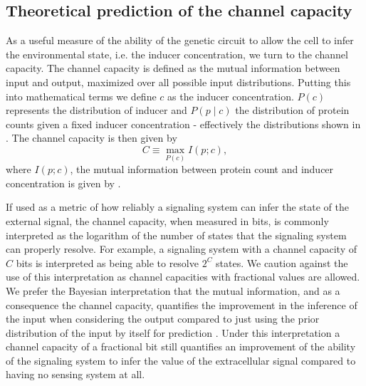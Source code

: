 \subsection{Theoretical prediction of the channel capacity}
\label{sec_channcap}

As a useful measure of the ability of the genetic circuit to allow the cell to
infer the environmental state, i.e. the inducer concentration, we turn to the
channel capacity. The channel capacity is defined as the mutual information
between input and output, maximized over all possible input distributions.
Putting this into mathematical terms we define $c$ as the inducer concentration.
$P(c)$ represents the distribution of inducer and $P(p \mid c)$ the distribution
of protein counts given a fixed inducer concentration - effectively the
distributions shown in . The channel capacity is then given by
\begin{equation}
  C \equiv \max_{P(c)} I(p; c),
  \label{eq_chann_cap}
\end{equation}
where $I(p; c)$, the mutual information between protein count and inducer
concentration is given by .

If used as a metric of how reliably a signaling system can infer the state
of the external signal, the channel capacity, when measured in bits, is commonly
interpreted as the logarithm of the number of states that the signaling system
can properly resolve. For example, a signaling system with a channel capacity
of $C$ bits is interpreted as being able to resolve $2^C$ states. We caution
against the use of this interpretation as channel capacities with fractional
values are allowed. We prefer the Bayesian interpretation that the mutual
information, and as a consequence the channel capacity, quantifies the
improvement in the inference of the input when considering the output compared
to just using the prior distribution of the input by itself for prediction
\cite{Voliotis2014a, Bowsher2014}. Under this interpretation a channel capacity
of a fractional bit still quantifies an improvement of the ability of the
signaling system to infer the value of the extracellular signal compared to
having no sensing system at all.

